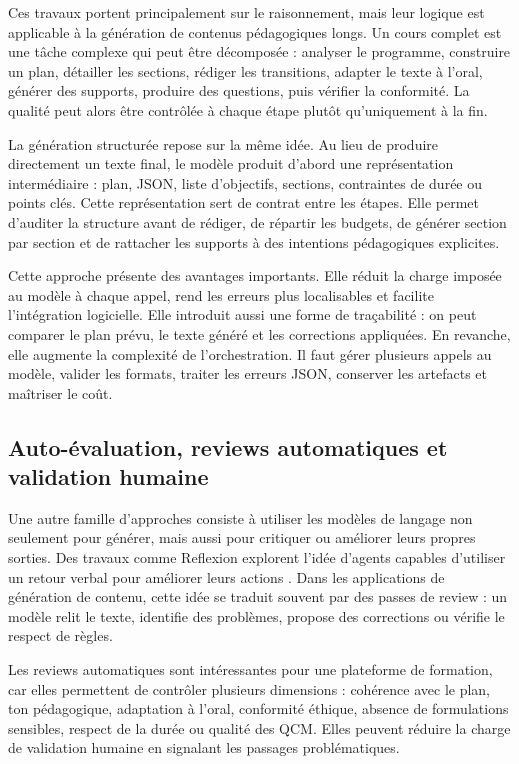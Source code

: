 \documentclass[12pt,a4paper]{article}
\begin{document}
Ces travaux portent principalement sur le raisonnement, mais leur logique est applicable
à la génération de contenus pédagogiques longs. Un cours complet est une tâche complexe
qui peut être décomposée : analyser le programme, construire un plan, détailler les
sections, rédiger les transitions, adapter le texte à l'oral, générer des supports, produire
des questions, puis vérifier la conformité. La qualité peut alors être contrôlée à chaque
étape plutôt qu'uniquement à la fin.

La génération structurée repose sur la même idée. Au lieu de produire directement un
texte final, le modèle produit d'abord une représentation intermédiaire : plan, JSON,
liste d'objectifs, sections, contraintes de durée ou points clés. Cette représentation sert
de contrat entre les étapes. Elle permet d'auditer la structure avant de rédiger, de répartir
les budgets, de générer section par section et de rattacher les supports à des intentions
pédagogiques explicites.

Cette approche présente des avantages importants. Elle réduit la charge imposée au
modèle à chaque appel, rend les erreurs plus localisables et facilite l'intégration logicielle.
Elle introduit aussi une forme de traçabilité : on peut comparer le plan prévu, le texte
généré et les corrections appliquées. En revanche, elle augmente la complexité de
l'orchestration. Il faut gérer plusieurs appels au modèle, valider les formats, traiter les
erreurs JSON, conserver les artefacts et maîtriser le coût.

\subsection{Auto-évaluation, reviews automatiques et validation humaine}

Une autre famille d'approches consiste à utiliser les modèles de langage non seulement
pour générer, mais aussi pour critiquer ou améliorer leurs propres sorties. Des travaux
comme Reflexion explorent l'idée d'agents capables d'utiliser un retour verbal pour
améliorer leurs actions \cite{shinn2023reflexion}. Dans les applications de génération de
contenu, cette idée se traduit souvent par des passes de review : un modèle relit le texte,
identifie des problèmes, propose des corrections ou vérifie le respect de règles.

Les reviews automatiques sont intéressantes pour une plateforme de formation, car elles
permettent de contrôler plusieurs dimensions : cohérence avec le plan, ton pédagogique,
adaptation à l'oral, conformité éthique, absence de formulations sensibles, respect de la
durée ou qualité des QCM. Elles peuvent réduire la charge de validation humaine en
signalant les passages problématiques.
\end{document}
